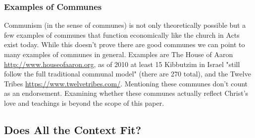 \documentclass[11pt]{article}
\begin{document}
\subsubsection{Examples of Communes}
Communism (in the sense of communes) is not only theoretically possible but a few examples of communes that function economically like the church in Acts exist today. While this doesn't prove there are good communes we can point to many examples of communes in general. Examples are The House of Aaron \url{http://www.houseofaaron.org}, as of 2010 at least 15 Kibbutzim in Israel "still follow the full traditional communal model" (there are 270 total),\cite{kibbutz} and the Twelve Tribes \url{https://www.twelvetribes.com/}. Mentioning these communes don't count as an endorsement. Examining whether these communes actually reflect Christ's love and teachings is beyond the scope of this paper. 

\subsection{Does All the Context Fit?}
\end{document}
